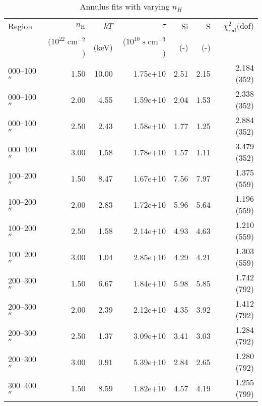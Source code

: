 \documentclass[preprint2,tighten,trackchanges]{aastex6}
\newcommand*{\mt}{\mathrm}
\newcommand*{\unit}[1]{\;\mt{#1}}  %
\begin{document}
\begin{table*}
    \centering
    \caption{Annulus fits with varying $n_H$}
    \begin{tabular}{@{}lrrrrrr@{}}
        \toprule
        Region & $n_\mathrm{H}$             & $kT$  & $\tau$                        & Si  & S   & $\chi^2_{\mathrm{red}} (\mathrm{dof}$) \\
               & ($10^{22} \unit{cm^{-2}}$) & (keV) & ($10^{10} \unit{s\;cm^{-3}}$) & (-) & (-) &  \\
        \midrule
        000--100$\mbox{$^{\prime\prime}$}$ & 1.50 &10.00 & 1.75e+10 & 2.51 & 2.15 & 2.184 (352) \\  %
        000--100$\mbox{$^{\prime\prime}$}$ & 2.00 & 4.55 & 1.59e+10 & 2.04 & 1.53 & 2.338 (352) \\  %
        000--100$\mbox{$^{\prime\prime}$}$ & 2.50 & 2.43 & 1.58e+10 & 1.77 & 1.25 & 2.884 (352) \\  %
        000--100$\mbox{$^{\prime\prime}$}$ & 3.00 & 1.58 & 1.78e+10 & 1.57 & 1.11 & 3.479 (352) \\  %
        \midrule
        100--200$\mbox{$^{\prime\prime}$}$ & 1.50 & 8.47 & 1.67e+10 & 7.56 & 7.97 & 1.375 (559) \\  %
        100--200$\mbox{$^{\prime\prime}$}$ & 2.00 & 2.83 & 1.72e+10 & 5.96 & 5.64 & 1.196 (559) \\  %
        100--200$\mbox{$^{\prime\prime}$}$ & 2.50 & 1.58 & 2.14e+10 & 4.93 & 4.63 & 1.210 (559) \\  %
        100--200$\mbox{$^{\prime\prime}$}$ & 3.00 & 1.04 & 2.85e+10 & 4.29 & 4.21 & 1.303 (559) \\  %
        \midrule
        200--300$\mbox{$^{\prime\prime}$}$ & 1.50 & 6.67 & 1.84e+10 & 5.98 & 5.85 & 1.742 (792) \\  %
        200--300$\mbox{$^{\prime\prime}$}$ & 2.00 & 2.39 & 2.12e+10 & 4.35 & 3.92 & 1.412 (792) \\  %
        200--300$\mbox{$^{\prime\prime}$}$ & 2.50 & 1.37 & 3.09e+10 & 3.41 & 3.03 & 1.284 (792) \\  %
        200--300$\mbox{$^{\prime\prime}$}$ & 3.00 & 0.91 & 5.39e+10 & 2.84 & 2.65 & 1.280 (792) \\  %
        \midrule
        300--400$\mbox{$^{\prime\prime}$}$ & 1.50 & 8.59 & 1.82e+10 & 4.57 & 4.19 & 1.255 (799) \\  %

\end{tabular}
\end{table*}
\end{document}
